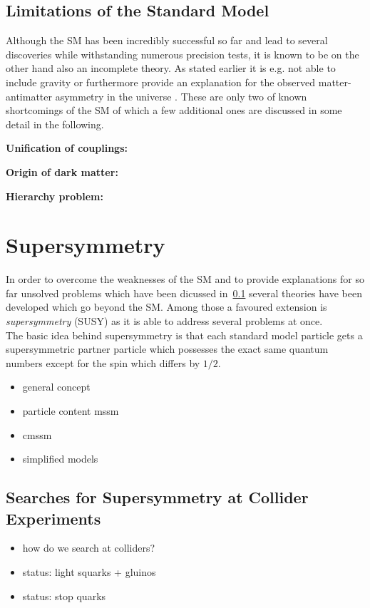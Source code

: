 \subsection{Limitations of the Standard Model}
\label{subsec:sm_shortcomings}
Although the SM has been incredibly successful so far and lead to several discoveries while withstanding numerous precision tests, it is known to be on the other hand also an incomplete theory. As stated earlier it is e.g. not able to include gravity or furthermore provide an explanation for the observed matter-antimatter asymmetry in the universe . These are only two of known shortcomings of the SM of which a few additional ones are discussed in some detail in the following.
\begin{description}
\item \textbf{Unification of couplings:}
\item \textbf{Origin of dark matter:}
\item \textbf{Hierarchy problem:}
\end{description}

\section{Supersymmetry}
\label{sec:susy}
In order to overcome the weaknesses of the SM and to provide explanations for so far unsolved problems which have been dicussed in~\ref{subsec:sm_shortcomings} several theories have been developed which go beyond the SM. Among those a favoured extension is \textit{supersymmetry} (SUSY) as it is able to address several problems at once. \\ 
The basic idea behind supersymmetry is that each standard model particle gets a supersymmetric partner particle which possesses the exact same quantum numbers except for the spin which differs by $1/2$.
\begin{itemize}
\item general concept
\item particle content mssm
\item cmssm
\item simplified models
\end{itemize}


\subsection{Searches for Supersymmetry at Collider Experiments}
\label{subsec:susy_status}

\begin{itemize}
\item how do we search at colliders?
\item status: light squarks + gluinos
\item status: stop quarks
\end{itemize}
